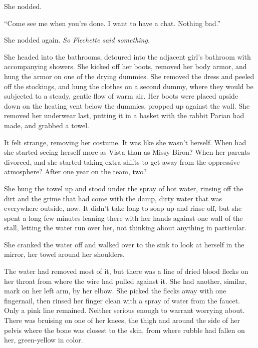 She nodded.



``Come see me when you're done.  I want to have a chat.  Nothing bad.''



She nodded again.  \emph{So Flechette said something}.



She headed into the bathrooms, detoured into the adjacent girl's bathroom with accompanying showers.  She kicked off her boots, removed her body armor, and hung the armor on one of the drying dummies.  She removed the dress and peeled off the stockings, and hung the clothes on a second dummy, where they would be subjected to a steady, gentle flow of warm air.  Her boots were placed upside down on the heating vent below the dummies, propped up against the wall.  She removed her underwear last, putting it in a basket with the rabbit Parian had made, and grabbed a towel.



It felt strange, removing her costume.  It was like she wasn't herself.  When had she started seeing herself more as Vista than as Missy Biron?  When her parents divorced, and she started taking extra shifts to get away from the oppressive atmosphere?  After one year on the team, two?



She hung the towel up and stood under the spray of hot water, rinsing off the dirt and the grime that had come with the damp, dirty water that was everywhere outside, now.  It didn't take long to soap up and rinse off, but she spent a long few minutes leaning there with her hands against one wall of the stall, letting the water run over her, not thinking about anything in particular.



She cranked the water off and walked over to the sink to look at herself in the mirror, her towel around her shoulders.



The water had removed most of it, but there was a line of dried blood flecks on her throat from where the wire had pulled against it.  She had another, similar, mark on her left arm, by her elbow.  She picked the flecks away with one fingernail, then rinsed her finger clean with a spray of water from the faucet.  Only a pink line remained.  Neither serious enough to warrant worrying about.  There was bruising on one of her knees, the thigh and around the side of her pelvis where the bone was closest to the skin, from where rubble had fallen on her, green-yellow in color.



